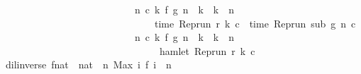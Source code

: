 \begin{isabellebody}
\ \ \ \ \ \ \ \ \ \ \ \ \ \ \ \ \ \ \ \ \ \ \ \ \ \ {\isasymand}\ {\isacharparenleft}{\isasymforall}n\ c\ k{\isachardot}\ f\ {\isacharparenleft}g\ n{\isacharparenright}\ {\isasymle}\ k\ {\isasymand}\ k\ {\isasymle}\ n\isanewline
\ \ \ \ \ \ \ \ \ \ \ \ \ \ \ \ \ \ \ \ \ \ \ \ \ \ \ \ \ \ {\isasymlongrightarrow}\ time\ {\isacharparenleft}{\isacharparenleft}Rep{\isacharunderscore}run\ r{\isacharparenright}\ k\ c{\isacharparenright}\ {\isacharequal}\ time\ {\isacharparenleft}{\isacharparenleft}Rep{\isacharunderscore}run\ sub{\isacharparenright}\ {\isacharparenleft}g\ n{\isacharparenright}\ c{\isacharparenright}{\isacharparenright}\isanewline
\ \ \ \ \ \ \ \ \ \ \ \ \ \ \ \ \ \ \ \ \ \ \ \ \ \ {\isasymand}\ {\isacharparenleft}{\isasymforall}n\ c\ k{\isachardot}\ f\ {\isacharparenleft}g\ n{\isacharparenright}\ {\isacharless}\ k\ {\isasymand}\ k\ {\isasymle}\ n\isanewline
\ \ \ \ \ \ \ \ \ \ \ \ \ \ \ \ \ \ \ \ \ \ \ \ \ \ \ \ \ \ {\isasymlongrightarrow}\ {\isasymnot}\ hamlet\ {\isacharparenleft}{\isacharparenleft}Rep{\isacharunderscore}run\ r{\isacharparenright}\ k\ c{\isacharparenright}{\isacharparenright}{\isacartoucheclose}\isanewline
\isanewline
{}\isamarkupfalse%
\ {\isacartoucheopen}dil{\isacharunderscore}inverse\ f{\isacharcolon}{\isacharcolon}{\isacharparenleft}nat\ {\isasymRightarrow}\ nat{\isacharparenright}\ {\isasymequiv}\ {\isacharparenleft}{\isasymlambda}n{\isachardot}\ Max\ {\isacharbraceleft}i{\isachardot}\ f\ i\ {\isasymle}\ n{\isacharbraceright}{\isacharparenright}{\isacartoucheclose}\isanewline
%
\isadelimtheory
\isanewline
%
\endisadelimtheory
%
\isatagtheory
{}\isamarkupfalse%
%
\endisatagtheory
{\isafoldtheory}%
%
\isadelimtheory
%
\endisadelimtheory
%
\end{isabellebody}%
\endinput
